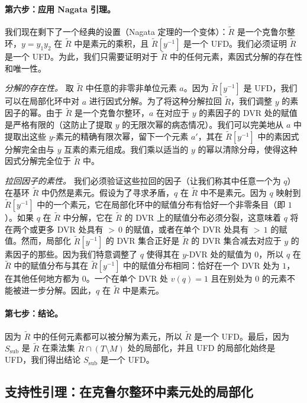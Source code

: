 \paragraph{第六步：应用 Nagata 引理。} 我们现在剩下了一个经典的设置（Nagata 定理的一个变体）：$\tilde{R}$ 是一个克鲁尔整环，$y = y_1 y_2$ 在 $\tilde{R}$ 中是素元的乘积，且 $\tilde{R}[y^{-1}]$ 是一个 UFD。我们必须证明 $\tilde{R}$ 是一个 UFD。为此，我们只需要证明对于 $\tilde{R}$ 中的任何元素，素因式分解的存在性和唯一性。

\emph{分解的存在性。} 取 $\tilde{R}$ 中任意的非零非单位元素 $a$。因为 $\tilde{R}[y^{-1}]$ 是 UFD，我们可以在局部化环中对 $a$ 进行因式分解。为了将这种分解拉回 $\tilde{R}$，我们调整 $y$ 的素因子的幂。由于 $\tilde{R}$ 是一个克鲁尔整环，$a$ 在对应于 $y$ 的素因子的 DVR 处的赋值是严格有限的（这防止了提取 $y$ 的无限次幂的病态情况）。我们可以完美地从 $a$ 中提取出这些 $y$-素元的精确有限次幂，留下一个元素 $a'$，其在 $\tilde{R}[y^{-1}]$ 中的素因式分解完全由与 $y$ 互素的素元组成。我们乘以适当的 $y$ 的幂以清除分母，使得这种因式分解完全位于 $\tilde{R}$ 中。

\emph{拉回因子的素性。} 我们必须验证这些拉回的因子（让我们称其中任意一个为 $q$）在基环 $\tilde{R}$ 中仍然是素元。假设为了寻求矛盾，$q$ 在 $\tilde{R}$ 中不是素元。因为 $q$ 映射到 $\tilde{R}[y^{-1}]$ 中的一个素元，它在局部化环中的赋值分布有恰好一个非零条目（即 $1$）。如果 $q$ 在 $\tilde{R}$ 中分解，它在 $\tilde{R}$ 的 DVR 上的赋值分布必须分裂，这意味着 $q$ 将在两个或更多 DVR 处具有 ${>}\,0$ 的赋值，或者在单个 DVR 处具有 ${>}\,1$ 的赋值。然而，局部化 $\tilde{R}[y^{-1}]$ 的 DVR 集合正好是 $\tilde{R}$ 的 DVR 集合减去对应于 $y$ 的素因子的那些。因为我们特意调整了 $q$ 使得其在 $y$-DVR 处的赋值为 $0$，所以 $q$ 在 $\tilde{R}$ 中的赋值分布与其在 $\tilde{R}[y^{-1}]$ 中的赋值分布相同：恰好在一个 DVR 处为 $1$，在其他任何地方都为 $0$。一个在单个 DVR 处 $v(q) = 1$ 且在别处为 $0$ 的元素不能被进一步分解。因此，$q$ 在 $\tilde{R}$ 中是素元。

\paragraph{第七步：结论。} 因为 $\tilde{R}$ 中的任何元素都可以被分解为素元，所以 $\tilde{R}$ 是一个 UFD。最后，因为 $S_{\mathrm{sub}}$ 是 $\tilde{R}$ 在乘法集 $\tilde{R} \cap (T \setminus M)$ 处的局部化，并且 UFD 的局部化始终是 UFD，我们得出结论 $S_{\mathrm{sub}}$ 是一个 UFD。

\subsection*{支持性引理：在克鲁尔整环中素元处的局部化}

